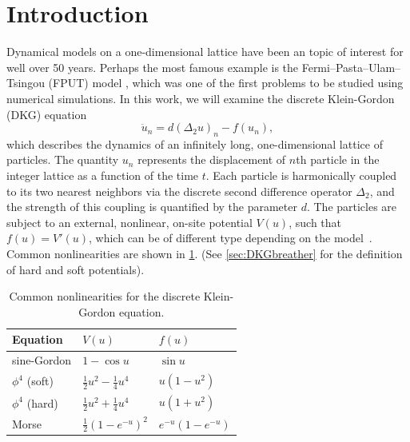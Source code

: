 \documentclass[12pt,reqno]{amsart}
\theoremstyle{definition}
\begin{document}
\section{Introduction}

Dynamical models on a one-dimensional lattice have been an topic of interest for well over 50 years. Perhaps the most famous example is the Fermi–Pasta–Ulam–Tsingou (FPUT) model \cites{FPUT,Zabusuy1965}, which was one of the first problems to be studied using numerical simulations. In this work, we will examine the discrete Klein-Gordon (DKG) equation~\cites{braun2004,SGbook,p4book,kivsharmalomed}
\begin{equation}\label{eq:introDKG}
\ddot{u}_n = d (\Delta_2 u)_n - f(u_n),
\end{equation}
which describes the dynamics of an infinitely long, one-dimensional lattice of particles. The quantity $u_n$ represents the displacement of $n$th particle in the integer lattice as a function of the time $t$. Each particle is harmonically coupled to its two nearest neighbors via the discrete second difference operator $\Delta_2$, and the strength of this coupling is quantified by the parameter $d$. The particles are subject to an external, nonlinear, on-site potential $V(u)$, such that $f(u) = V'(u)$, which can be of different
type depending on the model~\cites{Karachalios,imamat}. Common nonlinearities are shown in \cref{table:V}. (See \cref{sec:DKGbreather} for the definition of hard and soft potentials).

\begin{table}
\begin{tabular}{lll}\toprule
Equation & $V(u)$ & $f(u)$ \\ \midrule
sine-Gordon & $1 - \cos u$ & $\sin u$ \\
$\phi^4$ (soft) & $\frac{1}{2}u^2 - \frac{1}{4}u^4$ & $u(1-u^2)$ \\
$\phi^4$ (hard) & $\frac{1}{2}u^2 + \frac{1}{4}u^4$ & $u(1+u^2)$ \\
Morse & $\frac{1}{2}(1 - e^{-u})^2$ & $e^{-u}(1 - e^{-u})$ \\ \bottomrule
\end{tabular}
\caption{Common nonlinearities for the discrete Klein-Gordon equation.}
\label{table:V}
\end{table}
\end{document}
